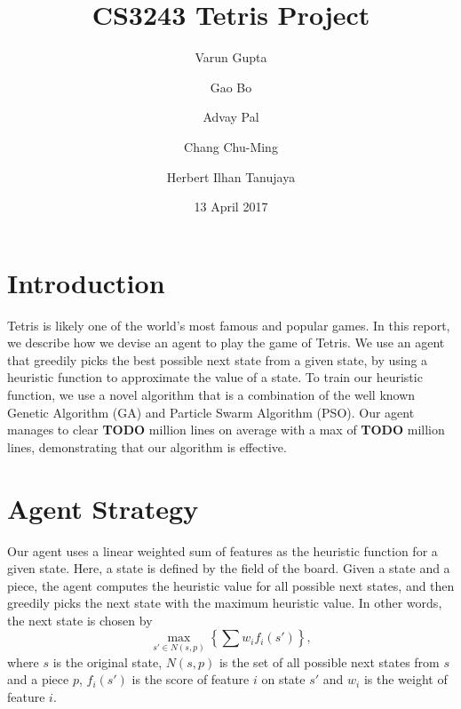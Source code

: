 \documentclass{article}
\title{CS3243 Tetris Project}
\author{Varun Gupta \and Gao Bo \and Advay Pal \and Chang Chu-Ming \and Herbert Ilhan Tanujaya}
\date{13 April 2017}
\begin{document}
\maketitle

\section{Introduction}
Tetris is likely one of the world's most famous and popular games.  In this
report, we describe how we devise an agent to play the game of Tetris.  We use
an agent that greedily picks the best possible next state from a given state,
by using a heuristic function to approximate the value of a state. To train our
heuristic function, we use a novel algorithm that is a combination of the well
known Genetic Algorithm (GA) and Particle Swarm Algorithm (PSO). Our agent
manages to clear \textbf{TODO} million lines on average with a max of
\textbf{TODO} million lines, demonstrating that our algorithm is effective.

\section{Agent Strategy}
Our agent uses a linear weighted sum of features as the heuristic function for
a given state. Here, a state is defined by the field of the board. Given a
state and a piece, the agent computes the heuristic value for all possible next
states, and then greedily picks the next state with the maximum heuristic
value. In other words, the next state is chosen by \[ \max_{s' \in N(s, p)}
\left\{ \sum w_i f_i(s') \right\}, \] where $s$ is the original state, $N(s, p)$
is the set of all possible next states from $s$ and a piece $p$, $f_i(s')$
is the score of feature $i$ on state $s'$ and $w_i$ is the weight of feature
$i$.
\end{document}
